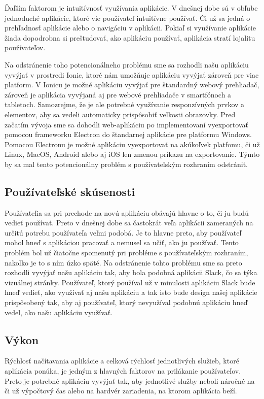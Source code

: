 \indent Ďaľším faktorom je intuitívnosť využívania aplikácie. V dnešnej dobe sú v obľube jednoduché aplikácie, ktoré vie používateľ intuitívne používať. Či už sa jedná o prehľadnosť aplikácie alebo o navigáciu v aplikácii. Pokiaľ si využívanie aplikácie žiada dopodrobna si preštudovať, ako aplikáciu používať, aplikácia stratí lojalitu používateľov. 

\indent Na odstránenie toho potencionálneho problému sme sa rozhodli našu aplikáciu vyvýjať v prostredi Ionic, ktoré nám umožňuje aplikáciu vyvýjať zároveň pre viac platform. V Ionicu je možné aplikáciu vyvýjať pre štandardný webový prehliadač, zároveň je aplikácia vyvýjaná aj pre webové prehliadače v smartfónoch a tabletoch. Samozrejme, že je ale potrebné využívanie responzívných prvkov a elementov, aby sa vedeli automaticky prispôsobiť veľkosti obrazovky. Pred začatím vývoja sme sa dohodli web-aplikáciu po implementovaní vyexportovať pomocou frameworku Electron do štandarnej aplikácie pre platformu Windows. Pomocou Electronu je možné aplikáciu vyexportovať na akúkoľvek platfomu, či už Linux, MacOS, Android alebo aj iOS len zmenou príkazu na exportovanie. Týmto by sa mal tento potencionálny problém s používateľským rozhraním odstrániť.

\subsection{Používateľské skúsenosti}
\indent Používateľia sa pri prechode na novú aplikáciu obávajú hlavne o to, či ju budú vedieť používať. Preto v dnešnej dobe sa častokrát veľa aplikácii zameraných na určitú potrebu používateľa veľmi podobá. Je to hlavne preto, aby používateľ mohol hneď s aplikáciou pracovať a nemusel sa učiť, ako ju používať. Tento problém bol už čiatočne spomenutý pri probléme s používateľským rozhraním, nakoľko je to s ním úzko späté. Na odstránenie tohto problému sme sa preto rozhodli vyvýjať našu aplikáciu tak, aby bola podobná aplikácii Slack, čo sa týka vizuálnej stránky. Používateľ, ktorý používal už v minulosti aplikáciu Slack bude hneď vedieť, ako využívať aj našu aplikáciu a tak isto bude design našej aplikácie prispôsobený tak, aby aj používateľ, ktorý nevyužíval podobnú aplikáciu hneď vedel, ako našu aplikáciu využívať.

\subsection{Výkon}
\indent Rýchlosť načítavania aplikácie a celková rýchlosť jednotlivých služieb, ktoré aplikácia ponúka, je jedným z hlavných faktorov na prilákanie používateľov. Preto je potrebné aplikáciu vyvýjať tak, aby jednotlivé služby neboli náročné na či už výpočtový čas alebo na hardvér zariadenia, na ktorom aplikácia beží. 

